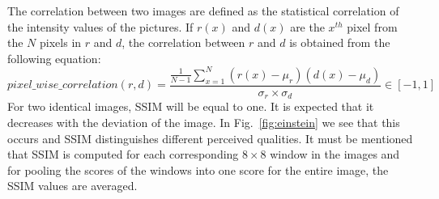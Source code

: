 The correlation between two images are defined as the statistical correlation of the intensity values of the pictures. If $r(x)$ and $d(x)$ are the $x^{th}$ pixel from the $N$ pixels in $r$ and $d$, the correlation between $r$ and $d$ is obtained from the following equation:
\begin{equation}
    pixel\_wise\_correlation(r, d) = \frac{\frac{1}{N-1}\sum_{x=1}^N(r(x)-\mu_r)(d(x)-\mu_d)}{\sigma_r\times \sigma_d} \in [-1, 1]
    \label{eq:corr}
\end{equation}
For two identical images, SSIM will be equal to one. It is expected that it decreases with the deviation of the image. In Fig.~\ref{fig:einstein} we see that this occurs and SSIM distinguishes different perceived qualities. It must be mentioned that SSIM is computed for each corresponding $8\times 8$ window in the images and for pooling the scores of the windows into one score for the entire image, the SSIM values are averaged.

